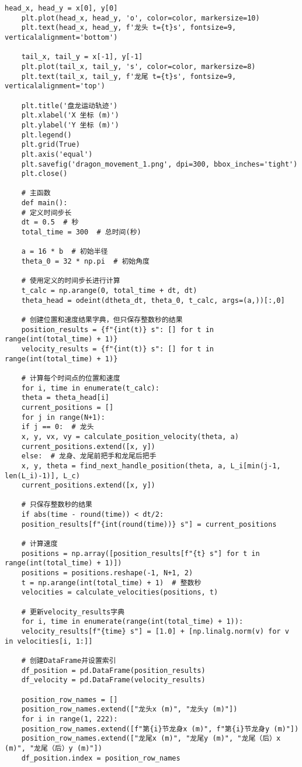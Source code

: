 \begin{lstlisting}[caption={问题一处理代码1}]
	head_x, head_y = x[0], y[0]
	plt.plot(head_x, head_y, 'o', color=color, markersize=10)
	plt.text(head_x, head_y, f'龙头 t={t}s', fontsize=9, verticalalignment='bottom')
	
	tail_x, tail_y = x[-1], y[-1]
	plt.plot(tail_x, tail_y, 's', color=color, markersize=8)
	plt.text(tail_x, tail_y, f'龙尾 t={t}s', fontsize=9, verticalalignment='top')
	
	plt.title('盘龙运动轨迹')
	plt.xlabel('X 坐标 (m)')
	plt.ylabel('Y 坐标 (m)')
	plt.legend()
	plt.grid(True)
	plt.axis('equal')
	plt.savefig('dragon_movement_1.png', dpi=300, bbox_inches='tight')
	plt.close()
	
	# 主函数
	def main():
	# 定义时间步长
	dt = 0.5  # 秒
	total_time = 300  # 总时间(秒)
	
	a = 16 * b  # 初始半径
	theta_0 = 32 * np.pi  # 初始角度
	
	# 使用定义的时间步长进行计算
	t_calc = np.arange(0, total_time + dt, dt)
	theta_head = odeint(dtheta_dt, theta_0, t_calc, args=(a,))[:,0]
	
	# 创建位置和速度结果字典，但只保存整数秒的结果
	position_results = {f"{int(t)} s": [] for t in range(int(total_time) + 1)}
	velocity_results = {f"{int(t)} s": [] for t in range(int(total_time) + 1)}
	
	# 计算每个时间点的位置和速度
	for i, time in enumerate(t_calc):
	theta = theta_head[i]
	current_positions = []
	for j in range(N+1):
	if j == 0:  # 龙头
	x, y, vx, vy = calculate_position_velocity(theta, a)
	current_positions.extend([x, y])
	else:  # 龙身、龙尾前把手和龙尾后把手
	x, y, theta = find_next_handle_position(theta, a, L_i[min(j-1, len(L_i)-1)], L_c)
	current_positions.extend([x, y])
	
	# 只保存整数秒的结果
	if abs(time - round(time)) < dt/2:
	position_results[f"{int(round(time))} s"] = current_positions
	
	# 计算速度
	positions = np.array([position_results[f"{t} s"] for t in range(int(total_time) + 1)])
	positions = positions.reshape(-1, N+1, 2)
	t = np.arange(int(total_time) + 1)  # 整数秒
	velocities = calculate_velocities(positions, t)
	
	# 更新velocity_results字典
	for i, time in enumerate(range(int(total_time) + 1)):
	velocity_results[f"{time} s"] = [1.0] + [np.linalg.norm(v) for v in velocities[i, 1:]]
	
	# 创建DataFrame并设置索引
	df_position = pd.DataFrame(position_results)
	df_velocity = pd.DataFrame(velocity_results)
	
	position_row_names = []
	position_row_names.extend(["龙头x (m)", "龙头y (m)"])
	for i in range(1, 222):
	position_row_names.extend([f"第{i}节龙身x (m)", f"第{i}节龙身y (m)"])
	position_row_names.extend(["龙尾x (m)", "龙尾y (m)", "龙尾（后）x (m)", "龙尾（后）y (m)"])
	df_position.index = position_row_names
	

\end{lstlisting}

